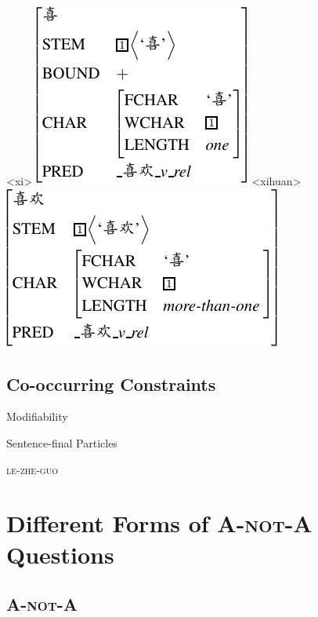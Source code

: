 \documentclass[11pt]{article}
\def\anota{\textsc{A-not-A}}
\begin{document}
{\small 
{}
\a<xi>
\vspace{-10pt}
\newline
\includegraphics[scale=.8]{pdf/xi.pdf}
\a<xihuan>
\vspace{-10pt}
\newline
\includegraphics[scale=.8]{pdf/xihuan.pdf}
\xe}
\vspace{-20pt}





\subsection{Co-occurring Constraints}
\label{ssec:cooccurring}





Modifiability


Sentence-final Particles


\textsc{le-zhe-guo}




\section{Different Forms of {\anota} Questions}
\label{sec:forms}



\subsection{\textsc{A-not-A}}
\label{ssec:basic}
\end{document}
